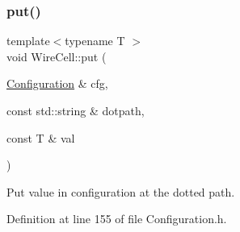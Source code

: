\subsubsection{\texorpdfstring{put()}{put()}}
{\footnotesize\ttfamily template$<$typename T $>$ \\
void Wire\+Cell\+::put (\begin{DoxyParamCaption}\item[{\hyperlink{namespace_wire_cell_a9f705541fc1d46c608b3d32c182333ee}{Configuration} \&}]{cfg,  }\item[{const std\+::string \&}]{dotpath,  }\item[{const T \&}]{val }\end{DoxyParamCaption})}



Put value in configuration at the dotted path. 



Definition at line 155 of file Configuration.\+h.


